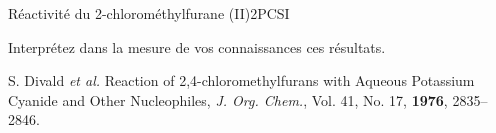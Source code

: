 \begin{exercise}{Réactivité du 2-chlorométhylfurane (II)}{2}{PCSI}
\begin{questions}
\begin{EnvUplevel}
\vspace{-1em}
\end{EnvUplevel}

    \question Interprétez dans la mesure de vos connaissances ces résultats.
\end{questions}

\plusloin S. Divald \emph{et al.} Reaction of 2,4-chloromethylfurans with Aqueous Potassium Cyanide and Other Nucleophiles, \textit{J. Org. Chem.}, Vol. 41, No. 17, \textbf{1976},  2835--2846.

\end{exercise}

